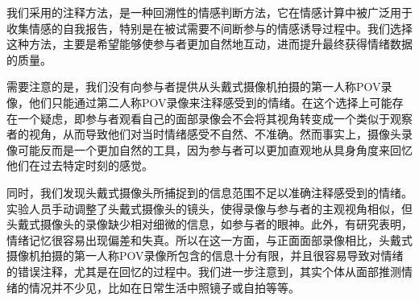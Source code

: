 我们采用的注释方法，是一种回溯性的情感判断方法，它在情感计算中被广泛用于收集情感的自我报告，特别是在被试需要不间断参与的情感诱导过程中。我们选择这种方法，主要是希望能够使参与者更加自然地互动，进而提升最终获得情绪数据的质量。

需要注意的是，我们没有向参与者提供从头戴式摄像机拍摄的第一人称POV录像，他们只能通过第二人称POV录像来注释感受到的情绪。在这个选择上可能存在一个疑虑，即参与者观看自己的面部录像会不会将其视角转变成一个类似于观察者的视角，从而导致他们对当时情绪感受不自然、不准确。然而事实上，摄像头录像可能反而是一个更加自然的工具，因为参与者可以更加直观地从具身角度来回忆他们在过去特定时刻的感觉。

同时，我们发现头戴式摄像头所捕捉到的信息范围不足以准确注释感受到的情绪。实验人员手动调整了头戴式摄像头的镜头，使得录像与参与者的主观视角相似，但头戴式摄像头的录像缺少相对细微的信息，如参与者的眼神。此外，有研究表明，情绪记忆很容易出现偏差和失真。所以在这一方面，与正面面部录像相比，头戴式摄像机拍摄的第一人称POV录像所包含的信息十分有限，并且很容易导致对情绪的错误注释，尤其是在回忆的过程中。我们进一步注意到，其实个体从面部推测情绪的情况并不少见，比如在日常生活中照镜子或自拍等等。

